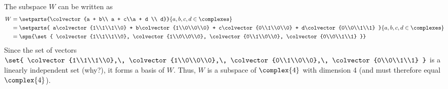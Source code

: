 The subspace $W$ can be written as 
\begin{align*} 
W &= \setparts{\colvector{a + b\\ a + c\\a + d \\ d}}{a, b, c, d \in\complexes}\\
%
&= \setparts{
a\colvector{1\\1\\1\\0} + 
b\colvector{1\\0\\0\\0} + 
c\colvector{0\\1\\0\\0} + 
d\colvector{0\\0\\1\\1}
}
{a, b, c, d \in\complexes}\\
%
&= \spn{\set{
\colvector{1\\1\\1\\0}, 
\colvector{1\\0\\0\\0}, 
\colvector{0\\1\\0\\0}, 
\colvector{0\\0\\1\\1}
}}
\end{align*}
%
Since the set of vectors 
$\set{
\colvector{1\\1\\1\\0},\,
\colvector{1\\0\\0\\0},\,
\colvector{0\\1\\0\\0},\,
\colvector{0\\0\\1\\1}
}$ 
is a linearly independent set (why?), it forms a basis of $W$.  Thus, $W$ is a subspace of $\complex{4}$ with dimension 4 (and must therefore equal $\complex{4}$).

